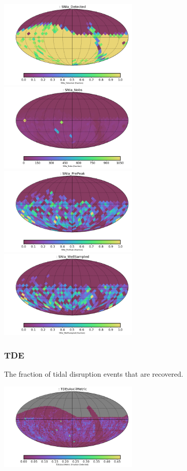 \includegraphics[width=0.5\textwidth]{metric_summary/sci_baseline_v1.4_10yrs/thumb._SNIa_Detected_USER_SkyMap.png}
\includegraphics[width=0.5\textwidth]{metric_summary/sci_baseline_v1.4_10yrs/thumb._SNIa_Nobs_USER_SkyMap.png}
\includegraphics[width=0.5\textwidth]{metric_summary/sci_baseline_v1.4_10yrs/thumb._SNIa_PrePeak_USER_SkyMap.png}
\includegraphics[width=0.5\textwidth]{metric_summary/sci_baseline_v1.4_10yrs/thumb._SNIa_WellSampled_USER_SkyMap.png}

\subsubsection{TDE}

The fraction of tidal disruption events that are recovered.

\includegraphics[width=0.5\textwidth]{metric_summary/sci_baseline_v1.4_10yrs/thumb._TDEsAsciiMetric_HEAL_SkyMap.png}

